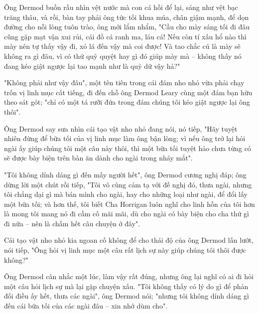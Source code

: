 Ông Dermod buồn rầu nhìn vệt nước mà con cá hồi để lại, sáng như vệt bạc trăng thâu, và rồi, bàn tay phải ông tức tối khua múa, chân giậm mạnh, để dọn đường cho nỗi lòng tuôn trào, ông mới lẩm nhẩm, "Cầu cho mày sáng tối đi đâu cũng gặp mạt vận xui rủi, cái đồ cá ranh ma, láu cá! Nếu còn tí xấu hổ nào thì mày nên tự thấy vậy đi, xỏ lá đến vậy mà coi được! Và tao chắc cú là mày sẽ không ra gì đâu, vì có thứ quỷ quyệt hay gì đó giúp mày mà – không thấy nó đang kéo giật ngược lại tao mạnh như là quỷ dữ vậy hả?"

"Không phải như vậy đâu", một tên tiên trong cái đám nho nhỏ vừa phải chạy trốn vị linh mục cất tiếng, đi đến chỗ ông Dermod Leary cùng một đám bạn hữu theo sát gót; "chỉ có một tá rưỡi đứa trong đám chúng tôi kéo giật ngược lại ông thôi".

Ông Dermod say sưa nhìn cái tạo vật nho nhỏ đang nói, nó tiếp, "Hãy tuyệt nhiên đừng để bữa tối của vị linh mục làm ông bận lòng; vì nếu ông trở lại hỏi ngài ấy giúp chúng tôi một câu này thôi, thì một bữa tối tuyệt hảo chưa từng có sẽ được bày biện trên bàn ăn dành cho ngài trong nháy mắt".

"Tôi không dính dáng gì đến mấy người hết", ông Dermod cương nghị đáp; ông dừng lời một chút rồi tiếp, "Tôi vô cùng cảm tạ với đề nghị đó, thưa ngài, nhưng tôi chẳng dại gì mà bán mình cho ngài, hay cho những loại như ngài, để đổi lấy một bữa tối; và hơn thế, tôi biết Cha Horrigan luôn nghĩ cho linh hồn của tôi hơn là mong tôi mang nó đi cầm cố mãi mãi, dù cho ngài có bày biện cho cha thứ gì đi nữa – nên là chấm hết câu chuyện ở đây".

Cái tạo vật nho nhỏ kia ngoan cố không để cho thái độ của ông Dermod lấn lướt, nói tiếp, "Ông hỏi vị linh mục một câu rất lịch sự này giúp chúng tôi thôi được không?"

Ông Dermod cân nhắc một lúc, làm vậy rất đúng, nhưng ông lại nghĩ có ai đi hỏi một câu hỏi lịch sự mà lại gặp chuyện xấu. "Tôi không thấy có lý do gì để phản đối điều ấy hết, thưa các ngài", ông Dermod nói; "nhưng tôi không dính dáng gì đến cái bữa tối của các ngài đâu – xin nhớ dùm cho".
